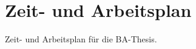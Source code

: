 
\chapter{Zeit- und Arbeitsplan}
\label{ch:ITILProzessunterstützung}
Zeit- und Arbeitsplan für die BA-Thesis.



